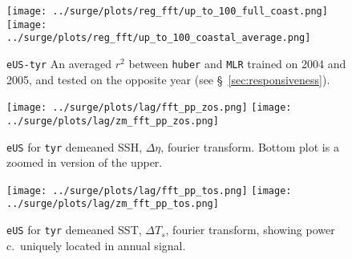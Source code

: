 
\begin{figure*}
\centering

\vspace{-35pt}
       \texttt{[image: ../surge/plots/reg\_fft/up\_to\_100\_full\_coast.png]}
        \texttt{[image: ../surge/plots/reg\_fft/up\_to\_100\_coastal\_average.png]}
            \caption{\texttt{eUS-tyr} An averaged $r^2$ between \texttt{huber} and \texttt{MLR} trained on 2004 and 2005,
                    and tested on the opposite year (see §~\ref{sec:responsiveness}).}
            \label{fig:lpredthresh}

\begin{minipage}{0.45\textwidth}
\texttt{[image: ../surge/plots/lag/fft\_pp\_zos.png]}
            \texttt{[image: ../surge/plots/lag/zm\_fft\_pp\_zos.png]}
            \caption{\texttt{eUS} for \texttt{tyr} demeaned SSH, $\Delta\eta$, fourier transform. Bottom plot is a zoomed in version of the upper.}
            \label{fig:zm_fft_zos}
            \end{minipage}\hspace{5pt} \begin{minipage}{0.45\textwidth}

        \texttt{[image: ../surge/plots/lag/fft\_pp\_tos.png]}
            \texttt{[image: ../surge/plots/lag/zm\_fft\_pp\_tos.png]}
            \caption{\texttt{eUS} for \texttt{tyr} demeaned SST, $\Delta T_s$, fourier transform,
                     showing power c.~uniquely located in annual signal.}
            \label{fig:zm_fft_tos}
            \end{minipage}

\end{figure*}
